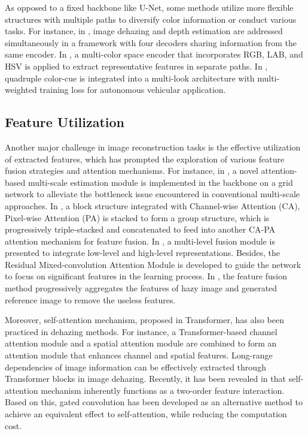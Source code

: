\documentclass[lettersize,journal]{IEEEtran}
\begin{document}
As opposed to a fixed backbone like U-Net, some methods utilize more flexible structures with multiple paths to diversify color information or conduct various tasks. For instance, in \cite{lee2020cnn}, image dehazing and depth estimation are addressed simultaneously in a framework with four decoders sharing information from the same encoder. In \cite{li2021underwater}, a multi-color space encoder that incorporates RGB, LAB, and HSV is applied to extract representative features in separate paths. In \cite{mehra2020reviewnet}, quadruple color-cue is integrated into a multi-look architecture with multi-weighted training loss for autonomous vehicular application.


\subsection{Feature Utilization}
Another major challenge in image reconstruction tasks is the effective utilization of extracted features, which has prompted the exploration of various feature fusion strategies and attention mechanisms. For instance, in \cite{liu2019griddehazenet}, a novel attention-based multi-scale estimation module is implemented in the backbone on a grid network to alleviate the bottleneck issue encountered in conventional multi-scale approaches. In \cite{qin2020ffa}, a block structure integrated with Channel-wise Attention (CA), Pixel-wise Attention (PA) is stacked to form a group structure, which is progressively triple-stacked and concatenated to feed into another CA-PA attention mechanism for feature fusion. In \cite{zhang2020multi}, a multi-level fusion module is presented to integrate low-level and high-level representations. Besides, the Residual Mixed-convolution Attention Module is developed to guide the network to focus on significant features in the learning process. In \cite{2022selfguided}, the feature fusion method progressively aggregates the features of hazy image and generated reference image to remove the useless features.

Moreover, self-attention mechanism, proposed in Transformer, has also been practiced in dehazing methods. For instance, a Transformer-based channel attention module and a spatial attention module are combined to form an attention module that enhances channel and spatial features\cite{gao2022novel}. Long-range dependencies of image information can be effectively extracted through Transformer blocks in image dehazing\cite{yang2022mstfdn}. Recently, it has been revealed in \cite{rao2022hornet} that self-attention mechanism inherently functions as a two-order feature interaction. Based on this, gated convolution has been developed as an alternative method to achieve an equivalent effect to self-attention, while reducing the computation cost. 
\end{document}
